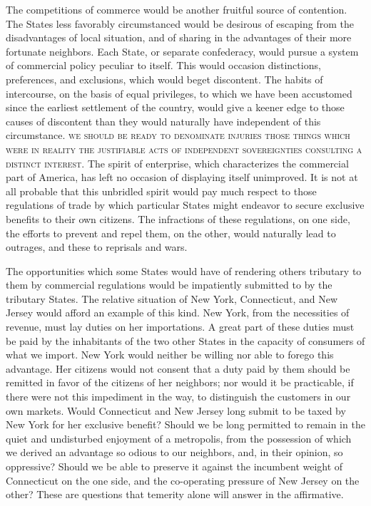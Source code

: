 The competitions of commerce would be another fruitful source of contention. 
The States less favorably circumstanced would be desirous of escaping from the disadvantages of local situation, and of sharing in the advantages of their more fortunate neighbors. 
Each State, or separate confederacy, would pursue a system of commercial policy peculiar to itself. 
This would occasion distinctions, preferences, and exclusions, which would beget discontent. 
The habits of intercourse, on the basis of equal privileges, to which we have been accustomed since the earliest settlement of the country, would give a keener edge to those causes of discontent than they would naturally have independent of this circumstance. 
\textsc{we should be ready to denominate injuries those things which were in reality the justifiable acts of independent sovereignties consulting a distinct interest}. 
The spirit of enterprise, which characterizes the commercial part of America, has left no occasion of displaying itself unimproved. 
It is not at all probable that this unbridled spirit would pay much respect to those regulations of trade by which particular States might endeavor to secure exclusive benefits to their own citizens. 
The infractions of these regulations, on one side, the efforts to prevent and repel them, on the other, would naturally lead to outrages, and these to reprisals and wars.

The opportunities which some States would have of rendering others tributary to them by commercial regulations would be impatiently submitted to by the tributary States. 
The relative situation of New York, Connecticut, and New Jersey would afford an example of this kind. 
New York, from the necessities of revenue, must lay duties on her importations. 
A great part of these duties must be paid by the inhabitants of the two other States in the capacity of consumers of what we import. 
New York would neither be willing nor able to forego this advantage. 
Her citizens would not consent that a duty paid by them should be remitted in favor of the citizens of her neighbors; nor would it be practicable, if there were not this impediment in the way, to distinguish the customers in our own markets. 
Would Connecticut and New Jersey long submit to be taxed by New York for her exclusive benefit? 
Should we be long permitted to remain in the quiet and undisturbed enjoyment of a metropolis, from the possession of which we derived an advantage so odious to our neighbors, and, in their opinion, so oppressive? 
Should we be able to preserve it against the incumbent weight of Connecticut on the one side, and the co-operating pressure of New Jersey on the other? 
These are questions that temerity alone will answer in the affirmative.

